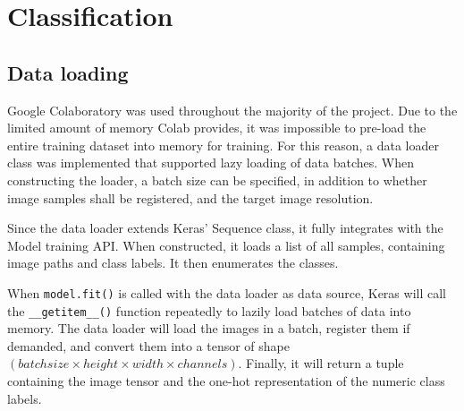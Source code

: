 \documentclass{l4proj}
\begin{document}

\section{Classification}

\subsection{Data loading}

Google Colaboratory was used throughout the majority of the project. Due to the limited amount of memory Colab provides, it was impossible to pre-load the entire training dataset into memory for training. For this reason, a data loader class was implemented that supported lazy loading of data batches. When constructing the loader, a batch size can be specified, in addition to whether image samples shall be registered, and the target image resolution. 

Since the data loader extends Keras' Sequence class, it fully integrates with the Model training API. When constructed, it loads a list of all samples, containing image paths and class labels. It then enumerates the classes.

When \lstinline{model.fit()} is called with the data loader as data source, Keras will call the \lstinline{__getitem__()} function repeatedly to lazily load batches of data into memory. The data loader will load the images in a batch, register them if demanded, and convert them into a tensor of shape $(batch size \times height \times width \times channels)$. Finally, it will return a tuple containing the image tensor and the one-hot representation of the numeric class labels.
\end{document}
